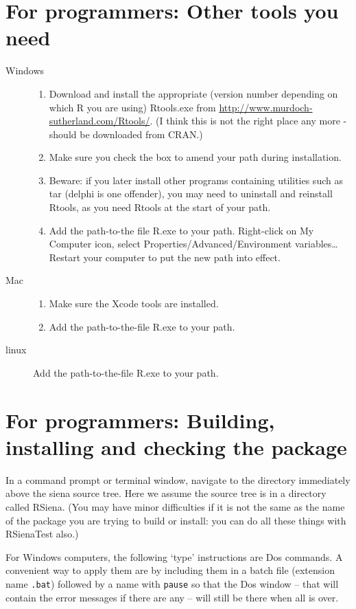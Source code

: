 \documentclass[a4paper,fleqn,11pt]{article}
\newcommand{\+}{\, + \,}
\newcommand{\sfn}[1]{\textsf{#1}}
\newcommand{\R}{{\sf R }}
\begin{document}
\section{For programmers: Other tools you need}
\begin{description}
\item[Windows]
\begin{enumerate}
\item Download and install the appropriate (version number
  depending on which \R you are using)
\textsf{Rtools.exe} from
  \url{http://www.murdoch-sutherland.com/Rtools/}.
  (I think this is not the right place any more - should be downloaded from CRAN.)
\item Make sure you check the box to amend your path during installation.
\item Beware: if you later install
  other programs containing utilities such as tar (delphi is one offender),
  you may need to uninstall and reinstall Rtools, as you need Rtools
  at the start of your path.
\item Add the path-to-the file
 R.exe to your path. Right-click on My Computer icon,
  select Properties/Advanced/Environment variables\ldots   \\
 Restart your computer to put the new path into effect.
\end{enumerate}
\item[Mac]
\begin{enumerate}
\item Make sure the Xcode tools are installed.
\item Add the path-to-the-file R.exe to your path.
\end{enumerate}
\item[linux]
 Add the path-to-the-file R.exe to your path.
\end{description}

\section{For programmers: Building, installing and checking the package}
In a command prompt or terminal window, navigate to the directory
immediately above the
siena source tree. Here we assume the source tree is in a directory
called \sfn{RSiena}. (You may have minor
difficulties if it is not the same as the name of the package you are trying to
build or install: you can do all these things with \sfn{RSienaTest} also.)

For Windows computers, the following `type' instructions are Dos commands.
A convenient way to apply them are by including them in a batch
file (extension name \texttt{.bat}) followed by a name with \verb|pause|
so that the Dos window -- that will contain the error messages
if there are any -- will still be there when all is over.
\end{document}
